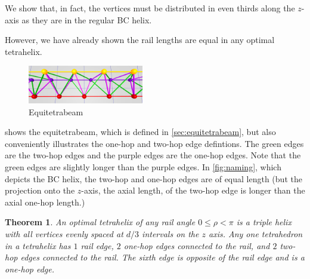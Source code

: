 \documentclass[twocolumn,10pt]{asme2ej}
\newtheorem{theorem}{Theorem}
\begin{document}
 We show that, in fact, the vertices must be distributed in even thirds
 along the $z$-axis as they are in the regular BC helix.

 However, we have already shown the rail
 lengths are equal in any optimal tetrahelix.

\begin{figure}
     \centering
     \includegraphics[width=0.45\textwidth]{figures/EquitetrabeamCloseUp.png}
     \caption{Equitetrabeam}
  \label{fig:equitetrabeam}
\end{figure}

 shows the equitetrabeam, which is defined in \cref{sec:equitetrabeam},
but also conveniently illustrates the one-hop and two-hop edge defintions.
The green edges are the two-hop edges and the purple edges are the one-hop edges. Note that the green
edges are slightly longer than the purple edges. In \cref{fig:naming}, which depicts the BC helix,
the two-hop and one-hop edges are of equal length (but the projection onto the $z$-axis, the
axial length, of the two-hop edge is longer than the axial one-hop length.)


\begin{theorem}
  \label{eventhirds}
  An optimal tetrahelix of any rail angle $0 \leq \rho < \pi$ is a triple helix with all vertices evenly spaced at $d/3$ intervals on the $z$ axis.
  Any one tetrahedron in a tetrahelix has $1$ rail edge, $2$ one-hop edges connected to the rail, and $2$ two-hop edges connected to the rail.
  The sixth edge is opposite of the rail edge and is a one-hop edge.
\end{theorem}
\end{document}
